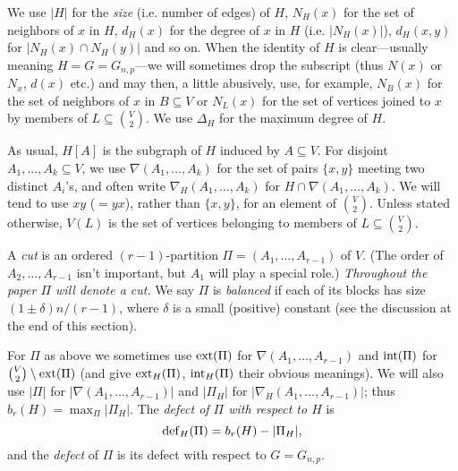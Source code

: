 \documentclass[letterpaper,11pt]{article}
\newcommand{\sub}[0]{\subseteq}
\newcommand{\sm}[0]{\setminus}
\renewcommand{\dots}[0]{,\ldots,}
\newcommand{\inte}[0]{{\rm int}}
\newcommand{\ext}[0]{{\rm ext}}
\newcommand{\deff}[0]{{\rm def}}
\newcommand{\0}[0]{\emptyset}
\newcommand{\C}[2]{{{#1}\choose{{#2}}}}
\newcommand{\gd}[0]{\delta }
\newcommand{\gD}[0]{\Delta }
\begin{document}
We use $|H|$ for the {\em size} (i.e. number of edges) of
$H$,
$N_H(x)$ for the set of neighbors
of $x$ in $H$, $d_H(x)$
for the degree of $x$ in $H$ (i.e. $|N_H(x)|$),
$d_H(x,y)$ for $|N_H(x)\cap N_H(y)|$ and so on.
When the identity of $H$ is clear---usually
meaning $H=G=G_{n,p}$---we will sometimes drop the
subscript (thus $N(x)$ or $N_x$, $d(x)$ etc.) and may then,
a little abusively,
use, for example, $N_B(x)$ for the set of neighbors
of $x$ in $B\sub V$ or $N_L(x)$ for the set of vertices
joined to $x$ by members of $L\sub \C{V}{2}$.
We use $\gD_H$ for the maximum degree of $H$.

As usual, $H[A]$ is the subgraph of $H$ induced by $A\sub V$.
For disjoint $A_1\dots A_k\sub V$, we use $\nabla(A_1\dots A_k)$
for the set of pairs $\{x,y\}$ meeting two distinct
$A_i$'s, and often
write $\nabla_H(A_1\dots A_k)$
for $H\cap \nabla(A_1\dots A_k)$.
%
We will tend to use $xy$ ($=yx$), rather than
$\{x,y\}$, for an element of $\C{V}{2}$.
Unless stated otherwise, $V(L)$ is the set of vertices belonging to
members of $L\sub\C{V}{2}$.







\medskip
A {\em cut} is an ordered $(r-1)$-partition $\Pi=(A_1\dots A_{r-1})$
of $V$.  (The order of $A_2\dots A_{r-1}$ isn't important,
but $A_1$ will play a special role.)
%
{\em Throughout the paper $\Pi$ will denote
a cut.}
We say $\Pi$ is {\em balanced} if each of its blocks has size
$(1\pm \gd)n/(r-1)$, where $\gd$ is a small (positive) constant
(see the discussion at the end of this section).



For $\Pi$ as above we sometimes use $\ext(\Pi)$
for $\nabla(A_1\dots A_{r-1})$ and $\inte(\Pi)$ for
$\C{V}{2}\sm \ext(\Pi)$
(and give $\ext_H(\Pi)$,
$\inte_H(\Pi)$ their obvious meanings).
%
We will also use $|\Pi|$ for
$|\nabla(A_1\dots A_{r-1})|$ and
$|\Pi_H|$ for
$|\nabla_H(A_1\dots A_{r-1})|$;
thus
$b_r(H) = \max_\Pi|\Pi_H|$.
The {\em defect of $\Pi$ with respect to $H$} is
\[\deff_H(\Pi) = b_r(H) -|\Pi_H|,\]
and the {\em defect} of $\Pi$ is its defect with respect to $G=G_{n,p}$.
\end{document}
